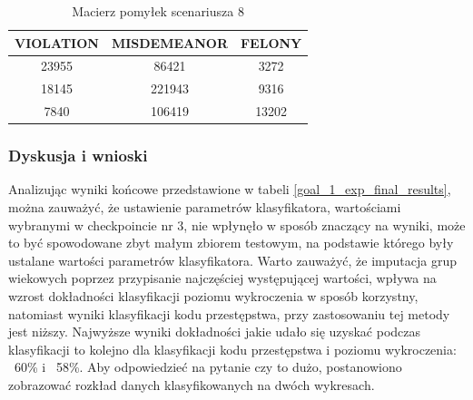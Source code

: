 \documentclass{classrep}
\begin{document}
{{{{                     \begin{table}
                     \small
                     \centering
                     \begin{tabular}{|c|c|c|}
                            \hline
                            VIOLATION & MISDEMEANOR & FELONY\\ \hline
                           23955 & 86421 &  3272\\ \hline
                           18145 & 221943  & 9316\\ \hline
                           7840 & 106419 & 13202 \\ \hline
                        \end{tabular}
                        \caption{Macierz pomyłek scenariusza 8 }
                        \label{goal_1_exp_final_results_matrix_2}
                     \end{table}
                     \FloatBarrier
                     
                }
            }
            
            \subsubsection{Dyskusja i wnioski} {
                Analizując wyniki końcowe przedstawione w tabeli
                \ref{goal_1_exp_final_results}, można zauważyć, że ustawienie
                parametrów klasyfikatora, wartościami wybranymi w checkpoincie nr 3,
                nie wpłynęło w sposób znaczący na wyniki, może to być spowodowane zbyt
                małym zbiorem testowym, na podstawie którego były ustalane wartości
                parametrów klasyfikatora. Warto zauważyć, że imputacja grup wiekowych
                poprzez przypisanie najczęściej występującej wartości, wpływa na wzrost
                dokładności klasyfikacji poziomu wykroczenia w sposób korzystny,
                natomiast wyniki klasyfikacji kodu przestępstwa, przy zastosowaniu tej
                metody jest niższy. Najwyższe wyniki dokładności jakie udało się
                uzyskać podczas klasyfikacji to kolejno dla klasyfikacji kodu
                przestępstwa i poziomu wykroczenia: ~60\% i ~58\%. Aby odpowiedzieć na
                pytanie czy to dużo, postanowiono zobrazować rozkład danych
                klasyfikowanych na dwóch wykresach.\\
                
}}}
\end{document}
